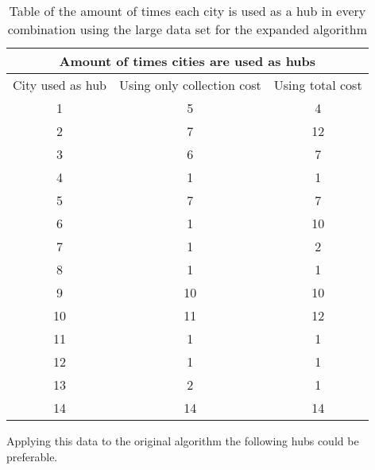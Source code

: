 \documentclass{article}
\begin{document}
             \begin{table}[h!]
                \begin{center}
                \begin{tabular}{||c|c|c||}
                    \hline
                    \multicolumn{3}{||c||}{Amount of times cities are used as hubs} \\
                    \hline
                    \hline
                    City used as hub & Using only collection cost & Using total cost\\
                    \hline
                    \hline
                    1 &  5 & 4 \\
                    \hline
                    2 & 7   & 12 \\
                    \hline
                    3& 6 & 7\\
                    \hline
                    4  & 1 & 1 \\
                    \hline
                    5 & 7 & 7\\
                    \hline
                    6 & 1 & 10   \\
                    \hline
                    7 & 1& 2 \\
                    \hline
                    8 & 1 & 1 \\
                    \hline
                    9 &  10& 10 \\
                    \hline
                    10 & 11 & 12 \\
                    \hline
                    11 & 1& 1 \\
                    \hline
                    12 & 1 & 1 \\
                    \hline
                    13 & 2& 1 \\
                    \hline
                    14 & 14& 14 \\
                    \hline
                \end{tabular}
                \end{center}
                \caption{Table of the amount of times each city is used as a hub in every combination using the large data set for the expanded algorithm}
                \label{amount of times hubs are used in collection expanded algorithm} 
            \end{table}
            
            Applying this data to the original algorithm the following hubs could be preferable.
            
\end{document}
